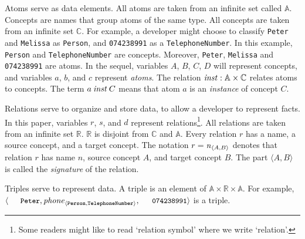\documentclass[runningheads]{llncs}
\newcommand{\id}[1]{\text{\it #1\/}}
\newcommand{\instance}{\mathbin{\id{inst}}}
\newcommand{\declare}[3]{\id{#1}_{\pair{#2}{#3}}}
\newcommand{\pair}[2]{\langle{#1},{#2}\rangle}
\newcommand{\Pair}[2]{#1\times#2}
\newcommand{\triple}[3]{\langle{#1},{#2},{#3}\rangle}
\newcommand{\atom}[1]{{\tt\small #1}}
\newcommand{\Atoms}{\mathbb{A}}
\newcommand{\concept}[1]{{\tt\small #1}}
\newcommand{\Concepts}{\mathbb{C}}
\newcommand{\Rels}{\mathbb{R}}   %
\newcommand{\Triple}[3]{#1\times#2\times#3}
\begin{document}
   Atoms serve as data elements.
   All atoms are taken from an infinite set called $\Atoms$.
   Concepts are names that group atoms of the same type.
   All concepts are taken from an infinite set $\Concepts$.
   For example, a developer might choose to classify \atom{Peter} and \atom{Melissa} as \concept{Person},
   and \atom{074238991} as a \concept{TelephoneNumber}.
   In this example, \concept{Person} and \concept{TelephoneNumber} are concepts.
   Moreover, \atom{Peter}, \atom{Melissa} and \atom{074238991} are atoms.
   In the sequel, variables $A$, $B$, $C$, $D$ will represent concepts, and variables $a$, $b$, and $c$ represent \emph{atoms}.
   The relation $\instance:\Pair{\Atoms}{\Concepts}$ relates atoms to concepts.
   The term $a\instance C$ means that atom $a$ is an \emph{instance} of concept $C$.

   Relations serve to organize and store data, to allow a developer to represent facts.
   In this paper, variables $r$, $s$, and $d$ represent relations\footnote{Some readers might like to read `relation symbol' where we write `relation'.}.
   All relations are taken from an infinite set $\Rels$.
   $\Rels$ is disjoint from $\Concepts$ and $\Atoms$.
   Every relation $r$ has a name, a source concept, and a target concept.
   The notation $r=\declare{n}{A}{B}$ denotes that relation $r$ has name $n$, source concept $A$, and target concept $B$.
   The part $\pair{A}{B}$ is called the {\em signature} of the relation.
   
   Triples serve to represent data.
   A triple %
   is an element of $\Triple{\Atoms}{\Rels}{\Atoms}$.
   For example, $\triple{\text{\atom{Peter}}}{\declare{\id{phone}}{\tt Person}{\tt TelephoneNumber}}{\text{\atom{074238991}}}$ is a triple.
   
\end{document}
